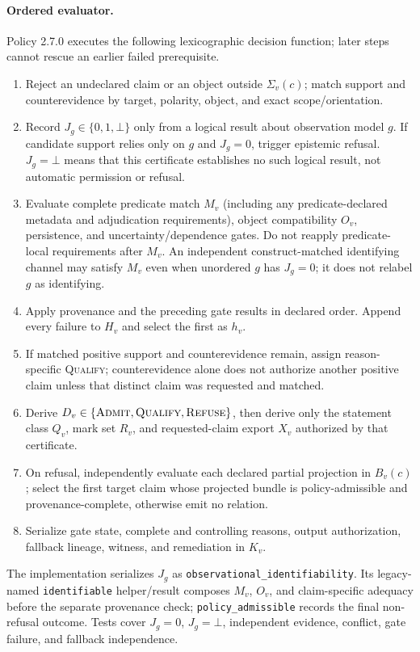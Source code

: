 \documentclass[manuscript,screen,review]{acmart}
\begin{document}
\paragraph{Ordered evaluator.} Policy 2.7.0 executes the following lexicographic decision function; later steps cannot rescue an earlier failed prerequisite.
\begin{enumerate}
  \item Reject an undeclared claim or an object outside $\Sigma_v(c)$; match support and counterevidence by target, polarity, object, and exact scope/orientation.
  \item Record $J_g\in\{0,1,\bot\}$ only from a logical result about observation model $g$. If candidate support relies only on $g$ and $J_g=0$, trigger epistemic refusal. $J_g=\bot$ means that this certificate establishes no such logical result, not automatic permission or refusal.
  \item Evaluate complete predicate match $M_v$ (including any predicate-declared metadata and adjudication requirements), object compatibility $O_v$, persistence, and uncertainty/dependence gates. Do not reapply predicate-local requirements after $M_v$. An independent construct-matched identifying channel may satisfy $M_v$ even when unordered $g$ has $J_g=0$; it does not relabel $g$ as identifying.
  \item Apply provenance and the preceding gate results in declared order. Append every failure to $H_v$ and select the first as $h_v$.
  \item If matched positive support and counterevidence remain, assign reason-specific \textsc{Qualify}; counterevidence alone does not authorize another positive claim unless that distinct claim was requested and matched.
  \item Derive $D_v\in\{\textsc{Admit},\textsc{Qualify},\textsc{Refuse}\}$, then derive only the statement class $Q_v$, mark set $R_v$, and requested-claim export $X_v$ authorized by that certificate.
  \item On refusal, independently evaluate each declared partial projection in $B_v(c)$; select the first target claim whose projected bundle is policy-admissible and provenance-complete, otherwise emit no relation.
  \item Serialize gate state, complete and controlling reasons, output authorization, fallback lineage, witness, and remediation in $K_v$.
\end{enumerate}
The implementation serializes $J_g$ as \texttt{observational\_identifiability}. Its legacy-named \texttt{identifiable} helper/result composes $M_v$, $O_v$, and claim-specific adequacy before the separate provenance check; \texttt{policy\_admissible} records the final non-refusal outcome. Tests cover $J_g=0$, $J_g=\bot$, independent evidence, conflict, gate failure, and fallback independence.
\end{document}
